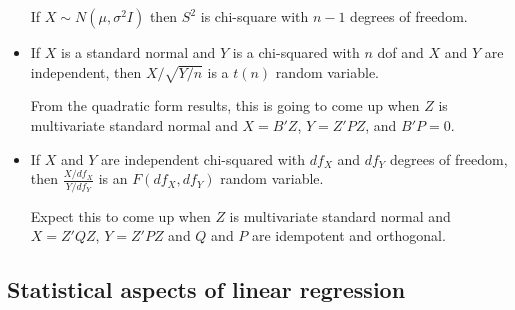 \begin{itemize}
  If $X \sim N(\mu, \sigma^2 I)$ then $S^2$ is chi-square with $n-1$ degrees of
  freedom.

\item %
  \begin{defn}
    If $X$ is a standard normal and $Y$ is a chi-squared with $n$ dof
    and $X$ and $Y$ are independent, then $X / \sqrt{Y/n}$ is a $t(n)$
    random variable.
  \end{defn}
  From the quadratic form results, this is going to come up when $Z$
  is multivariate standard normal and $X = B'Z$, $Y = Z'PZ$, and $B'P
  = 0$.

\item %
  \begin{defn}
    If $X$ and $Y$ are independent chi-squared with $df_X$ and $df_Y$
    degrees of freedom, then $\frac{X/df_X}{Y/df_Y}$ is an $F(df_X,
    df_Y)$ random variable.
  \end{defn}

  Expect this to come up when $Z$ is multivariate standard normal and
  $X = Z'QZ$, $Y = Z'PZ$ and $Q$ and $P$ are idempotent and orthogonal.

\end{itemize}

\subsection{Statistical aspects of linear regression}

